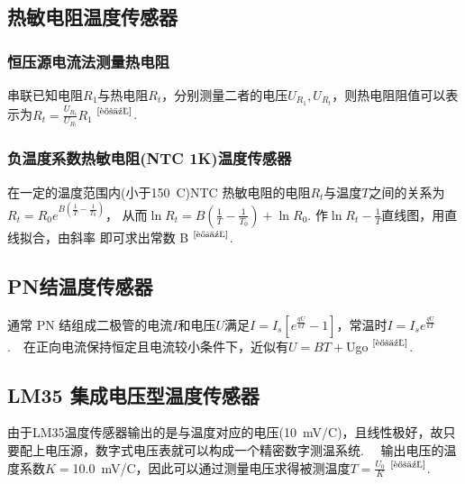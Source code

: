 \documentclass[a4paper,12pt]{article}%
\begin{document}
\subsection{热敏电阻温度传感器}
\subsubsection{恒压源电流法测量热电阻}
\begin{spacing}{1.528}%
串联已知电阻$R_1$与热电阻$R_t$，分别测量二者的电压$U_{R_1},U_{R_t}$，则热电阻阻值可以表示为$R_t=\frac{U_{R_t}}{U_{R_!}}R_1$
$^\text{\cite{讲义}}$.

\subsubsection{负温度系数热敏电阻(NTC 1K)温度传感器}
在一定的温度范围内(小于150~\degree  C)NTC 热敏电阻的电阻$R_t$与温度$T$之间的关系为$R_t=R_0e^{B\left(\frac{1}{T}-\frac{1}{T_0}\right)}$，
从而$\ln R_t=B\left(\frac{1}{T}-\frac{1}{T_0}\right)+\ln R_0$.
作$\ln R_t-\frac{1}{T}$直线图，用直线拟合，由斜率 即可求出常数 B
$^\text{\cite{讲义}}$.~~
\end{spacing}

\subsection{PN结温度传感器}
\begin{spacing}{1.528}%
通常 PN 结组成二极管的电流$I$和电压$U$满足$I=I_s\left[e^{\frac{qU}{kT}}-1\right]$，常温时$I=I_se^{\frac{qU}{kT}}$.~~在正向电流保持恒定且电流较小条件下，近似有$U=BT+$Ugo
$^\text{\cite{讲义}}$.
\end{spacing}

\subsection{LM35 集成电压型温度传感器}
\begin{spacing}{1.528}%
由于LM35温度传感器输出的是与温度对应的电压(10~mV/\degree  C)，且线性极好，故只要配上电压源，数字式电压表就可以构成一个精密数字测温系统.~~
输出电压的温度系数$K=$10.0~mV/\degree  C，因此可以通过测量电压求得被测温度$T=\frac{U_0}{K}$
$^\text{\cite{讲义}}$.~~
\end{spacing}
\end{document}
